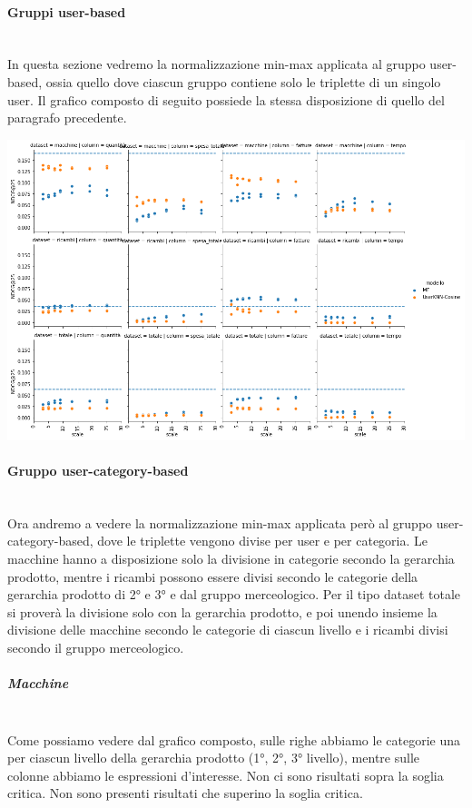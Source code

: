 \paragraph{Gruppi user-based}\mbox{} \\
In questa sezione vedremo la normalizzazione min-max applicata al gruppo user-based, ossia quello dove ciascun gruppo contiene solo le triplette di un singolo user. Il grafico composto di seguito possiede la stessa disposizione di quello del paragrafo precedente.

\includegraphics[width=16cm]{figures/risultati_minmax_singolo.png}
\newpage
\paragraph{Gruppo user-category-based}\mbox{} \\
Ora andremo a vedere la normalizzazione min-max applicata però al gruppo user-category-based, dove le triplette vengono divise per user e per categoria.
Le macchine hanno a disposizione solo la divisione in categorie secondo la gerarchia prodotto, mentre i ricambi possono essere divisi secondo le categorie della gerarchia prodotto di 2° e 3° e dal gruppo merceologico. Per il tipo dataset totale si proverà la divisione solo con la gerarchia prodotto, e poi unendo insieme la divisione delle macchine secondo le categorie di ciascun livello e i ricambi divisi secondo il gruppo merceologico.

\subparagraph{Macchine}\mbox{} \\
Come possiamo vedere dal grafico composto, sulle righe abbiamo le categorie una per ciascun livello della gerarchia prodotto (1°, 2°, 3° livello), mentre sulle colonne abbiamo le espressioni d'interesse. Non ci sono risultati sopra la soglia critica. Non sono presenti risultati che superino la soglia critica.\\

